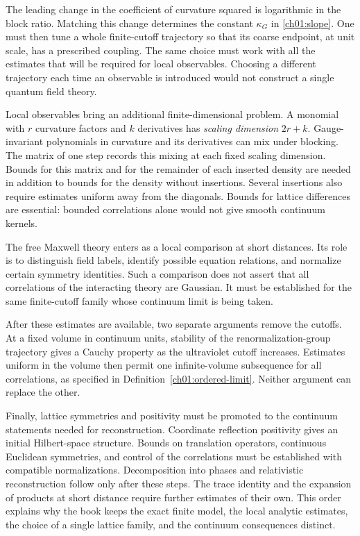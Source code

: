The leading change in the coefficient of curvature squared is logarithmic
in the block ratio. Matching this change determines the constant
$\kappa_G$ in \eqref{ch01:slope}. One must then tune a whole finite-cutoff
trajectory so that its coarse endpoint, at unit scale, has a prescribed coupling.
The same choice must work with all the estimates that will be required for
local observables. Choosing a different trajectory each time an observable
is introduced would not construct a single quantum field theory.

Local observables bring an additional finite-dimensional problem.
A monomial with $r$ curvature factors and $k$ derivatives has
\emph{scaling dimension} $2r+k$. Gauge-invariant polynomials in curvature and
its derivatives can mix under blocking. The matrix of one step records this mixing at each fixed scaling
dimension. Bounds for this matrix and for the remainder of each inserted
density are needed in addition to bounds for the density without
insertions. Several insertions also require estimates uniform away from
the diagonals. Bounds for lattice differences are essential:
bounded correlations alone would not give smooth continuum kernels.

The free Maxwell theory enters as a local comparison at short distances.
Its role is to distinguish field labels, identify possible equation
relations, and normalize certain symmetry identities. Such a comparison
does not assert that all correlations of the interacting theory are
Gaussian. It must be established for the same finite-cutoff family whose
continuum limit is being taken.

After these estimates are available, two separate arguments remove the
cutoffs. At a fixed volume in continuum units, stability of the renormalization-group
trajectory gives a Cauchy property as the ultraviolet cutoff increases.
Estimates uniform in the volume then permit one
infinite-volume subsequence for all correlations, as specified in
Definition~\ref{ch01:ordered-limit}. Neither argument can replace the other.

Finally, lattice symmetries and positivity must be promoted to the
continuum statements needed for reconstruction. Coordinate reflection
positivity gives an initial Hilbert-space structure. Bounds on translation
operators, continuous Euclidean symmetries, and control of the correlations
must be established with compatible normalizations. Decomposition into
phases and relativistic reconstruction follow only after these steps.
The trace identity and the expansion of products at short distance
require further estimates of their own. This order explains why the book
keeps the exact finite model, the local analytic estimates, the choice of a
single lattice family, and the continuum consequences distinct.
